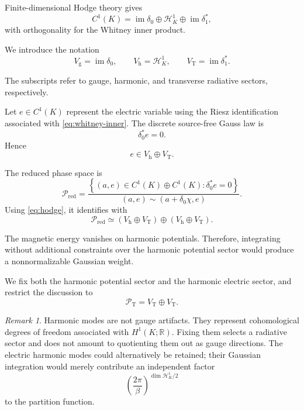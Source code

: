 \documentclass[11pt]{article}
\theoremstyle{definition}
\theoremstyle{remark}
\newtheorem{remark}[theorem]{Remark}
\newcommand{\R}{\mathbb{R}}
\newcommand{\im}{\operatorname{im}}
\begin{document}
Finite-dimensional Hodge theory gives
\begin{equation}
C^1(K)
=
\im\delta_0
\oplus
\mathcal H_K^1
\oplus
\im\delta_1^\ast,
\label{eq:hodge}
\end{equation}
with orthogonality for the Whitney inner product.

We introduce the notation
\begin{equation}
V_{\mathrm g}
=
\im\delta_0,
\qquad
V_{\mathrm h}
=
\mathcal H_K^1,
\qquad
V_{\mathrm T}
=
\im\delta_1^\ast.
\label{eq:sector-notation}
\end{equation}

The subscripts refer to gauge, harmonic, and transverse
radiative sectors, respectively.

Let \(e\in C^1(K)\) represent the electric variable using
the Riesz identification associated with
\eqref{eq:whitney-inner}. The discrete source-free Gauss law
is
\begin{equation}
\delta_0^\ast e=0.
\label{eq:gauss}
\end{equation}
Hence
\begin{equation}
e\in
V_{\mathrm h}\oplus V_{\mathrm T}.
\label{eq:e-sector}
\end{equation}

The reduced phase space is
\begin{equation}
\mathcal P_{\mathrm{red}}
=
\frac{
\left\{
(a,e)\in C^1(K)\oplus C^1(K):
\delta_0^\ast e=0
\right\}
}{
(a,e)\sim(a+\delta_0\chi,e)
}.
\label{eq:reduced-phase}
\end{equation}
Using \eqref{eq:hodge}, it identifies with
\begin{equation}
\mathcal P_{\mathrm{red}}
\simeq
\left(
V_{\mathrm h}\oplus V_{\mathrm T}
\right)
\oplus
\left(
V_{\mathrm h}\oplus V_{\mathrm T}
\right).
\label{eq:reduced-identification}
\end{equation}

The magnetic energy vanishes on harmonic potentials.
Therefore, integrating without additional constraints over
the harmonic potential sector would produce a nonnormalizable
Gaussian weight.

We fix both the harmonic potential sector and the harmonic
electric sector, and restrict the discussion to
\begin{equation}
\mathcal P_{\mathrm T}
=
V_{\mathrm T}\oplus V_{\mathrm T}.
\label{eq:radiative-phase}
\end{equation}

\begin{remark}
Harmonic modes are not gauge artifacts. They represent
cohomological degrees of freedom associated with
\(H^1(K;\R)\). Fixing them selects a radiative sector and
does not amount to quotienting them out as gauge directions.
The electric harmonic modes could alternatively be retained;
their Gaussian integration would merely contribute an
independent factor
\[
\left(
\frac{2\pi}{\beta}
\right)^{\dim\mathcal H_K^1/2}
\]
to the partition function.
\end{remark}
\end{document}
